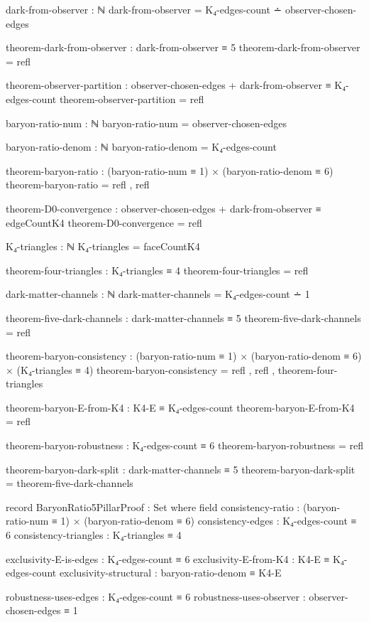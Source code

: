 \documentclass[11pt,a4paper]{book}
\begin{document}
\begin{code}
dark-from-observer : ℕ
dark-from-observer = K₄-edges-count ∸ observer-chosen-edges

theorem-dark-from-observer : dark-from-observer ≡ 5
theorem-dark-from-observer = refl

theorem-observer-partition : observer-chosen-edges + dark-from-observer ≡ K₄-edges-count
theorem-observer-partition = refl

baryon-ratio-num : ℕ
baryon-ratio-num = observer-chosen-edges

baryon-ratio-denom : ℕ
baryon-ratio-denom = K₄-edges-count

theorem-baryon-ratio : (baryon-ratio-num ≡ 1) × (baryon-ratio-denom ≡ 6)
theorem-baryon-ratio = refl , refl

theorem-D0-convergence : observer-chosen-edges + dark-from-observer ≡ edgeCountK4
theorem-D0-convergence = refl

K₄-triangles : ℕ
K₄-triangles = faceCountK4

theorem-four-triangles : K₄-triangles ≡ 4
theorem-four-triangles = refl

dark-matter-channels : ℕ
dark-matter-channels = K₄-edges-count ∸ 1

theorem-five-dark-channels : dark-matter-channels ≡ 5
theorem-five-dark-channels = refl

theorem-baryon-consistency : (baryon-ratio-num ≡ 1)
                           × (baryon-ratio-denom ≡ 6)
                           × (K₄-triangles ≡ 4)
theorem-baryon-consistency = refl
                           , refl
                           , theorem-four-triangles

theorem-baryon-E-from-K4 : K4-E ≡ K₄-edges-count
theorem-baryon-E-from-K4 = refl

theorem-baryon-robustness : K₄-edges-count ≡ 6
theorem-baryon-robustness = refl

theorem-baryon-dark-split : dark-matter-channels ≡ 5
theorem-baryon-dark-split = theorem-five-dark-channels

record BaryonRatio5PillarProof : Set where
  field
    consistency-ratio : (baryon-ratio-num ≡ 1) × (baryon-ratio-denom ≡ 6)
    consistency-edges : K₄-edges-count ≡ 6
    consistency-triangles : K₄-triangles ≡ 4
    
    exclusivity-E-is-edges : K₄-edges-count ≡ 6
    exclusivity-E-from-K4 : K4-E ≡ K₄-edges-count
    exclusivity-structural : baryon-ratio-denom ≡ K4-E
    
    robustness-uses-edges : K₄-edges-count ≡ 6
    robustness-uses-observer : observer-chosen-edges ≡ 1
    

\end{code}
\end{document}

